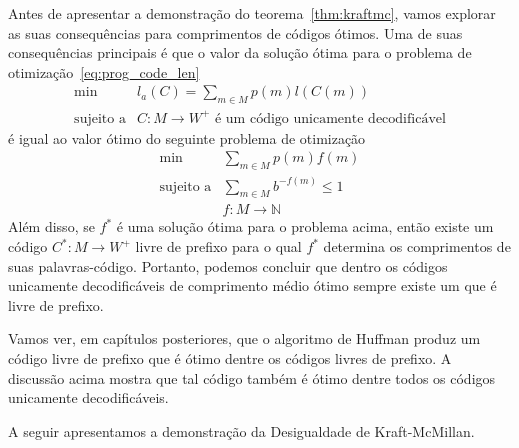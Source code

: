 Antes de apresentar a demonstração do teorema~\ref{thm:kraftmc}, vamos
explorar as suas consequências para comprimentos de códigos
ótimos. Uma de suas consequências principais é que o valor da solução
ótima para o problema de otimização~\ref{eq:prog_code_len}
\begin{equation*} 
  \begin{array}{rl}
    \min & l_a(C) = \sum_{m\in M} p(m) l(C(m))\\
    \text{sujeito a} &C: M \to W^+ \text{ é um código unicamente decodificável}
  \end{array}
\end{equation*}
é igual ao valor ótimo do seguinte problema de otimização
\begin{equation*} 
  \begin{array}{rl}
    \min & \sum_{m\in M} p(m) f(m)\\
    \text{sujeito a} &\sum_{m \in M} b^{-f(m)} \leq 1\\
    & f:M\to\mathbb{N}
  \end{array}
\end{equation*}
Além disso, se $f^*$ é uma solução ótima para o problema acima, então
existe um código $C^*: M \to W^+$ livre de prefixo para o qual $f^*$
determina os comprimentos de suas palavras-código. Portanto, podemos
concluir que dentro os códigos unicamente decodificáveis de
comprimento médio ótimo sempre existe um que é livre de prefixo.
 
Vamos ver, em capítulos posteriores, que o algoritmo de Huffman produz
um código livre de prefixo que é ótimo dentre os códigos livres de
prefixo. A discussão acima mostra que tal código também é ótimo dentre
todos os códigos unicamente decodificáveis.

A seguir apresentamos a demonstração da Desigualdade de
Kraft-McMillan.


